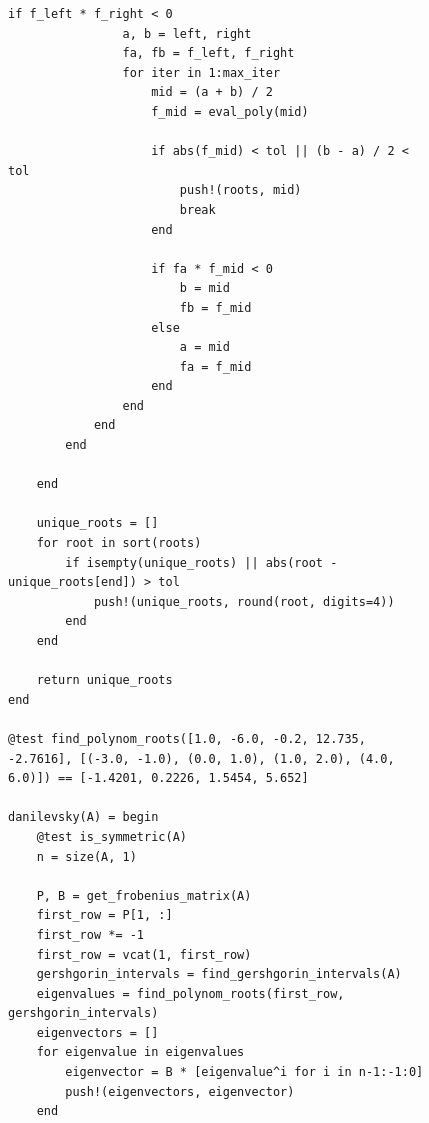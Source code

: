 \documentclass[a4paper, 14pt]{extarticle}
\begin{document}
\begin{figure}[!htb]
\begin{lstlisting}[language={},caption={Метод Данилевского (продолжение)},label={lst:code3}]
            if f_left * f_right < 0
                a, b = left, right
                fa, fb = f_left, f_right
                for iter in 1:max_iter
                    mid = (a + b) / 2
                    f_mid = eval_poly(mid)

                    if abs(f_mid) < tol || (b - a) / 2 < tol
                        push!(roots, mid)
                        break
                    end

                    if fa * f_mid < 0
                        b = mid
                        fb = f_mid
                    else
                        a = mid
                        fa = f_mid
                    end
                end
            end
        end

    end

    unique_roots = []
    for root in sort(roots)
        if isempty(unique_roots) || abs(root - unique_roots[end]) > tol
            push!(unique_roots, round(root, digits=4))
        end
    end

    return unique_roots
end

@test find_polynom_roots([1.0, -6.0, -0.2, 12.735, -2.7616], [(-3.0, -1.0), (0.0, 1.0), (1.0, 2.0), (4.0, 6.0)]) == [-1.4201, 0.2226, 1.5454, 5.652]

danilevsky(A) = begin
    @test is_symmetric(A)
    n = size(A, 1)

    P, B = get_frobenius_matrix(A)
    first_row = P[1, :]
    first_row *= -1
    first_row = vcat(1, first_row)
    gershgorin_intervals = find_gershgorin_intervals(A)
    eigenvalues = find_polynom_roots(first_row, gershgorin_intervals)
    eigenvectors = []
    for eigenvalue in eigenvalues
        eigenvector = B * [eigenvalue^i for i in n-1:-1:0]
        push!(eigenvectors, eigenvector)
    end
\end{lstlisting}
\end{figure}
\end{document}
